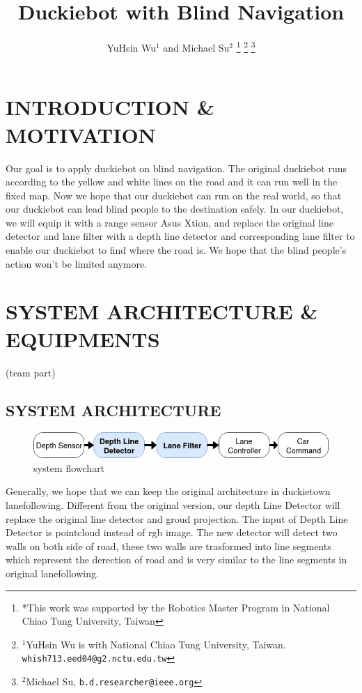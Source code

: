 \documentclass[letterpaper, 10 pt, conference]{ieeeconf}  %
\title{\LARGE \bf
Duckiebot with Blind Navigation
}
\author{YuHsin Wu$^{1}$ and Michael Su$^{2}$%
\thanks{*This work was supported by the Robotics Master Program in National Chiao Tung University, Taiwan}%
\thanks{$^{1}$YuHsin Wu is with National Chiao Tung University, Taiwan.
        {\tt\small whish713.eed04@g2.nctu.edu.tw}}%
\thanks{$^{2}$Michael Su,
        {\tt\small b.d.researcher@ieee.org}}%
}
\begin{document}
\maketitle
\thispagestyle{empty}
\pagestyle{empty}


\section{INTRODUCTION \& MOTIVATION}

Our goal is to apply duckiebot on blind navigation. The original duckiebot runs according to the yellow and white lines on the road and it can run well in the fixed map. Now we hope that our duckiebot can run on the real world, so that our duckiebot can lead blind people to the destination safely. In our duckiebot, we will equip it with a range sensor Asus Xtion, and replace the original line detector and lane filter with a depth line detector and corresponding lane filter to enable our duckiebot to find where the road is. We hope that the blind people's action won't be limited anymore.

\section{SYSTEM ARCHITECTURE \& EQUIPMENTS}

(team part)

\subsection{SYSTEM ARCHITECTURE}
\begin{figure}[h] %
\includegraphics[width=1.0\columnwidth]{system_flowchart.png}
\centering
\caption{system flowchart}
\end{figure}

Generally, we hope that we can keep the original architecture in duckietown lanefollowing. Different from the original version, our depth Line Detector will replace the original line detector and groud projection. The input of Depth Line Detector is pointcloud instead of rgb image. The new detector will detect two walls on both side of road, these two walls are trasformed into line segments which represent the derection of road and is very similar to the line segments in original lanefollowing. 
\end{document}
